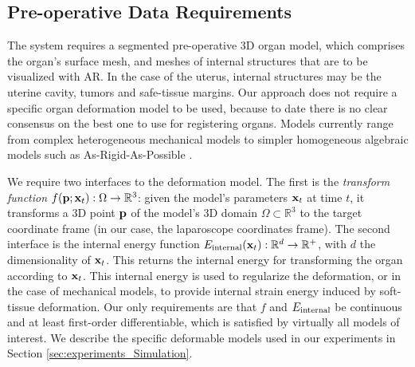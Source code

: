 \subsection{Pre-operative Data Requirements}
\label{sec:inputModels}
The system requires a segmented pre-operative 3D organ model, which comprises the organ's surface mesh, and meshes of internal structures that are to be visualized with AR.
In the case of the uterus, internal structures may be the uterine cavity, tumors and safe-tissue margins. %
Our approach does not require a specific organ deformation model to be used, because to date there is no clear consensus on the best one to use for registering organs. Models currently range from complex heterogeneous mechanical models to simpler homogeneous algebraic models such as As-Rigid-As-Possible \cite{Sorkine:2007:ASM:1281991.1282006}. 

We require two interfaces to the deformation model. 
The first is the \emph{transform function} $f(\mathbf{p};\mathbf{x}_t): \Omega\rightarrow \mathbb{R}^3$: given the model's parameters $\mathbf{x}_t$ at time $t$, it transforms a 3D point $\mathbf{p}$ of the model's 3D domain $\Omega\subset \mathbb{R}^3$ to the target coordinate frame (in our case, the laparoscope coordinates frame). 
The second interface is the internal energy function $E_{\text{internal}}(\mathbf{x}_{t}):\mathbb{R}^{d}\rightarrow\mathbb{R}^{+}$, with $d$ the dimensionality of $\mathbf{x}_{t}$. This returns the internal energy for transforming the organ according to  $\mathbf{x}_t$.
This internal energy is used to regularize the deformation, or in the case of mechanical models, to provide internal strain energy induced by soft-tissue deformation.
Our only requirements are that $f$ and $E_{\text{internal}}$ be continuous and at least first-order differentiable, which is satisfied by virtually all models of interest. We describe the specific deformable models used in our experiments in Section \ref{sec:experiments_Simulation}.
 
